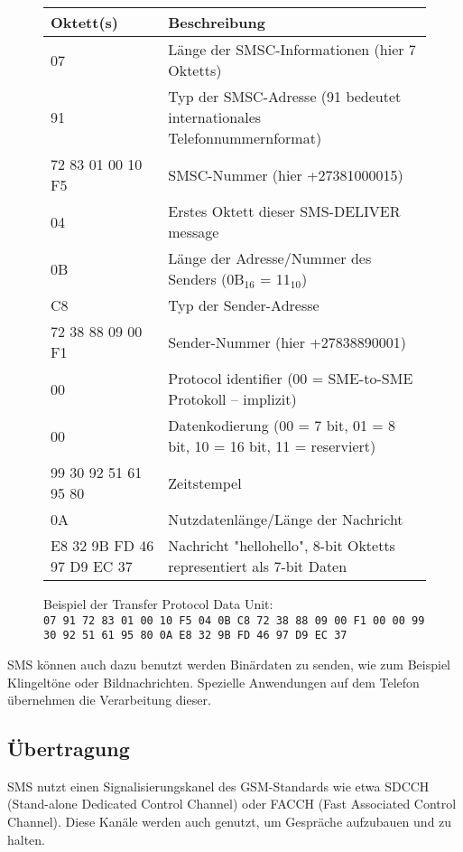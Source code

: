 \documentclass[german,12pt,a4paper]{article}
\begin{document}
\begin{figure}[h!]
    \centering
    \begin{tabular}{ p{4cm} | p{10cm} }
        Oktett(s) & Beschreibung \\
        \hline \hline
         07 & Länge der SMSC-Informationen (hier 7 Oktetts) \\ 
         \hline
         91 & Typ der SMSC-Adresse (91 bedeutet internationales Telefonnummernformat) \\ 
         \hline
         72 83 01 00 10 F5 & SMSC-Nummer (hier +27381000015) \\ 
         \hline
         04 & Erstes Oktett dieser SMS-DELIVER message \\ 
         \hline
         0B & Länge der Adresse/Nummer des Senders (0B$_{16}$ = 11$_{10}$) \\ 
         \hline
         C8 & Typ der Sender-Adresse \\ 
         \hline
         72 38 88 09 00 F1 & Sender-Nummer (hier +27838890001) \\ 
         \hline
         00 & Protocol identifier (00 = SME-to-SME Protokoll -- implizit) \\ 
         \hline
         00 & Datenkodierung (00 = 7 bit, 01 = 8 bit, 10 = 16 bit, 11 = reserviert) \\ 
         \hline
         99 30 92 51 61 95 80 & Zeitstempel \\ 
         \hline
         0A & Nutzdatenlänge/Länge der Nachricht \\ 
         \hline
         E8 32 9B FD 46 97 D9 EC 37 & Nachricht "hellohello", 8-bit Oktetts representiert als 7-bit Daten
    \end{tabular}
    \label{tbl:sms-struct}

    \caption{Beispiel der Transfer Protocol Data Unit: \\
        \texttt{07 91 72 83 01 00 10 F5 04 0B C8 72 38 88 09 00 F1 00 00 99 30 92 51 61 95 80 0A E8 32 9B FD 46 97 D9 EC 37}
    }
\end{figure}


SMS können auch dazu benutzt werden Binärdaten zu senden, wie zum Beispiel 
Klingeltöne oder Bildnachrichten. Spezielle Anwendungen auf 
dem Telefon übernehmen die Verarbeitung dieser.

\subsection{Übertragung}
SMS nutzt einen Signalisierungskanel des GSM-Standards wie etwa SDCCH (Stand-alone Dedicated Control Channel) 
oder FACCH (Fast Associated Control Channel). Diese Kanäle werden auch genutzt, um Gespräche aufzubauen und zu 
halten.
\end{document}
